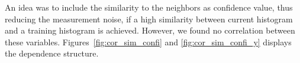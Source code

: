 An idea was to include the similarity to the neighbors as confidence
value, thus reducing the measurement noise, if a high similarity
between current histogram and a training histogram is
achieved. However, we found no correlation between these
variables. Figures~\ref{fig:cor_sim_confi} and \ref{fig:cor_sim_confi_y} displays the
dependence structure.